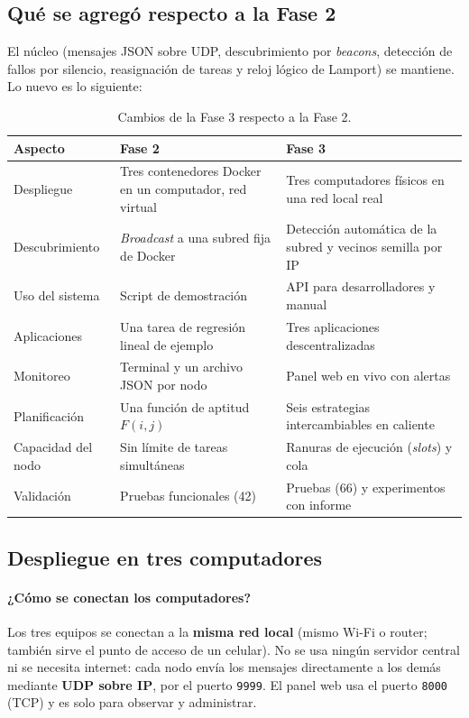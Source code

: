 \documentclass{article}
\begin{document}
\subsection{Qué se agregó respecto a la Fase 2}

El núcleo (mensajes JSON sobre UDP, descubrimiento por \emph{beacons}, detección de fallos por
silencio, reasignación de tareas y reloj lógico de Lamport) se mantiene. Lo nuevo es lo siguiente:

\begin{table}[htbp]
\centering
\small
\begin{tabular}{|p{}|p{}|p{}|}
\hline
\textbf{Aspecto} & \textbf{Fase 2} & \textbf{Fase 3} \\ \hline
Despliegue & Tres contenedores Docker en un computador, red virtual & Tres computadores físicos en una red local real \\ \hline
Descubrimiento & \emph{Broadcast} a una subred fija de Docker & Detección automática de la subred y vecinos semilla por IP \\ \hline
Uso del sistema & Script de demostración & API para desarrolladores y manual \\ \hline
Aplicaciones & Una tarea de regresión lineal de ejemplo & Tres aplicaciones descentralizadas \\ \hline
Monitoreo & Terminal y un archivo JSON por nodo & Panel web en vivo con alertas \\ \hline
Planificación & Una función de aptitud $F(i,j)$ & Seis estrategias intercambiables en caliente \\ \hline
Capacidad del nodo & Sin límite de tareas simultáneas & Ranuras de ejecución (\emph{slots}) y cola \\ \hline
Validación & Pruebas funcionales (42) & Pruebas (66) y experimentos con informe \\ \hline
\end{tabular}
\caption{Cambios de la Fase 3 respecto a la Fase 2.}
\label{tab:fase2-fase3}
\end{table}

\subsection{Despliegue en tres computadores}

\paragraph{¿Cómo se conectan los computadores?}
Los tres equipos se conectan a la \textbf{misma red local} (mismo Wi-Fi o router; también sirve el
punto de acceso de un celular). No se usa ningún servidor central ni se necesita internet: cada
nodo envía los mensajes directamente a los demás mediante \textbf{UDP sobre IP}, por el puerto
\texttt{9999}. El panel web usa el puerto \texttt{8000} (TCP) y es solo para observar y administrar.
\end{document}
